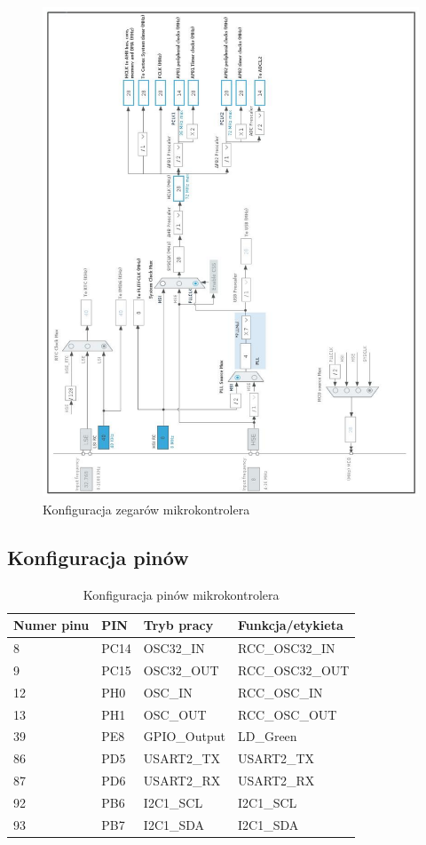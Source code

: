 \documentclass[10pt, a4paper]{article}
\begin{document}
\newpage
\begin{figure}[H]
	\centering
	\includegraphics[width=0.9\textheight,angle=90]{konfiguracja_clk.png}
	\caption{Konfiguracja zegarów mikrokontrolera}
	\label{fig:KonfiguracjaZegara}
\end{figure}

\subsection{Konfiguracja pinów}

\begin{table}[H]
	\centering
	\begin{tabular}{|l|l|l|l|}
		\hline
		Numer pinu	&	PIN & Tryb pracy & Funkcja/etykieta\\
		\hline
		8&	PC14 & OSC32\_IN &	RCC\_OSC32\_IN	\\
		9&	PC15 & OSC32\_OUT &	RCC\_OSC32\_OUT	\\
		12&	PH0 & OSC\_IN &	RCC\_OSC\_IN	\\
		13&	PH1 & OSC\_OUT &	RCC\_OSC\_OUT	\\
		39&	PE8 &	GPIO\_Output&	LD\_Green \\
		86&	PD5 &	USART2\_TX&	USART2\_TX\\
		87&	PD6 &	USART2\_RX&	USART2\_RX\\
		92&	PB6 &	I2C1\_SCL&	I2C1\_SCL\\
		93&	PB7 &	I2C1\_SDA&	I2C1\_SDA\\
		\hline
	\end{tabular}
	\caption{Konfiguracja pinów mikrokontrolera}
	\label{tab:KonfiguracjaPinów}	
\end{table}
\end{document}
